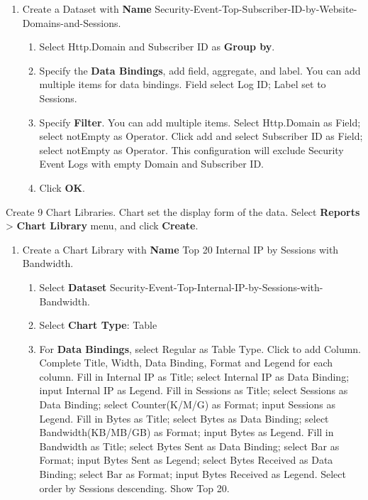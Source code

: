 \begin{description}
\begin{enumerate}
\begin{enumerate}
            \item	Specify \textbf{Filter}. Select Http.Domain as Field; select notEmpty as Operator. This configuration will exclude Security Event Logs with empty Domain.
            \item	Click \textbf{OK}.
        \end{enumerate}
        \item Create a Dataset with \textbf{Name} Security-Event-Top-Subscriber-ID-by-Website-Domains-and-Sessions.
        \begin{enumerate}
            \item	Select Http.Domain and Subscriber ID as \textbf{Group by}. 
            \item	Specify the \textbf{Data Bindings}, add field, aggregate, and label. You can add multiple items for data bindings. Field select Log ID; Label set to Sessions.
            \item	Specify \textbf{Filter}. You can add multiple items. Select Http.Domain as Field; select notEmpty as Operator. Click add and select Subscriber ID as Field; select notEmpty as Operator. This configuration will exclude Security Event Logs with empty Domain and Subscriber ID.
            \item	Click \textbf{OK}.
        \end{enumerate}
    \end{enumerate}
    \item[STEP 2.]	Create 9 Chart Libraries. Chart set the display form of the data. Select \textbf{Reports} > \textbf{Chart Library} menu, and click \textbf{Create}.
    \begin{enumerate}
        \item Create a Chart Library with \textbf{Name} Top 20 Internal IP by Sessions with Bandwidth.
        \begin{enumerate}
            \item	Select \textbf{Dataset} Security-Event-Top-Internal-IP-by-Sessions-with-Bandwidth.
            \item	Select \textbf{Chart Type}: Table
            \item	For \textbf{Data Bindings}, select Regular as Table Type. Click to add Column. Complete Title, Width, Data Binding, Format and Legend for each column. Fill in Internal IP as Title; select Internal IP as Data Binding; input Internal IP as Legend. Fill in Sessions as Title; select Sessions as Data Binding; select Counter(K/M/G) as Format; input Sessions as Legend. Fill in Bytes as Title; select Bytes as Data Binding; select Bandwidth(KB/MB/GB) as Format; input Bytes as Legend. Fill in Bandwidth as Title; select Bytes Sent as Data Binding; select Bar as Format; input Bytes Sent as Legend; select Bytes Received as Data Binding; select Bar as Format; input Bytes Received as Legend. Select order by Sessions descending. Show Top 20.

\end{enumerate}
\end{enumerate}
\end{description}
